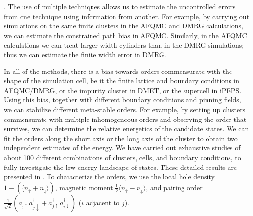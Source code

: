 \documentclass[12pt]{article}
\newcommand{\red}{}
\newcommand{\blue}{\textcolor{blue}}
\begin{document}
. The use of multiple techniques allows
us to estimate the uncontrolled errors from one technique using information from another. For example,
by carrying out simulations on the same finite clusters in the AFQMC and DMRG calculations, we can estimate
the constrained path bias in AFQMC. Similarly, in the AFQMC calculations we can treat larger width cylinders
than in the DMRG simulations; thus we can estimate the finite width error in DMRG.

In all of the methods, there is a bias towards orders commensurate with the shape of the simulation cell, be 
it the finite lattice and boundary conditions in AFQMC/DMRG, or the impurity cluster in DMET,  or the supercell in iPEPS.
Using this bias, together with different boundary conditions and pinning fields, we
can stabilize different meta-stable orders. For example, by setting up clusters commensurate 
with multiple inhomogeneous orders and observing the order that survives, we can determine the relative energetics of 
the candidate states. We can fit the orders along the short axis or the long axis of the cluster to obtain 
two independent estimates of the energy. We have carried out exhaustive studies of about 100
different combinations of clusters, cells, and boundary conditions, 
to fully investigate the low-energy landscape of states. 
These detailed results are presented in \cite{supplementary}.
To characterize the orders, we use the local hole density $1 - (\langle n_{\uparrow}+n_\downarrow\rangle)$,  
magnetic moment $\frac{1}{2} \langle n_{\uparrow}- n_{\downarrow}\rangle$,  and pairing order 
$\frac{1}{\sqrt{2}}(a_{i\uparrow}^{\dagger}a_{j\downarrow}^{\dagger}+a_{j\uparrow}^{\dagger}a_{i\downarrow}^{\dagger})$
($i$ adjacent to $j$). 


\end{document}
